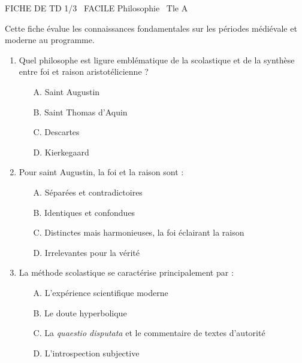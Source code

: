 \documentclass[11pt]{article}
\begin{document}
\begin{tcolorbox}[enhanced,colback=popink,colframe=popink,arc=10pt,boxrule=0pt,left=12pt,right=12pt,top=9pt,bottom=9pt]
{\color{white}\popxbold\small FICHE DE TD 1/3 \textbullet\ FACILE \hfill Philosophie \textbullet\ Tle A\par}
\end{tcolorbox}
\vspace{4pt}
Cette fiche évalue les connaissances fondamentales sur les périodes médiévale et moderne au programme.

\begin{exercice}
\begin{enumerate}
    \item Quel philosophe est ligure emblématique de la scolastique et de la synthèse entre foi et raison aristotélicienne ?
    \begin{itemize}
        \item[A.] Saint Augustin
        \item[B.] Saint Thomas d'Aquin
        \item[C.] Descartes
        \item[D.] Kierkegaard
    \end{itemize}
    \item Pour saint Augustin, la foi et la raison sont :
    \begin{itemize}
        \item[A.] Séparées et contradictoires
        \item[B.] Identiques et confondues
        \item[C.] Distinctes mais harmonieuses, la foi éclairant la raison
        \item[D.] Irrelevantes pour la vérité
    \end{itemize}
    \item La méthode scolastique se caractérise principalement par :
    \begin{itemize}
        \item[A.] L'expérience scientifique moderne
        \item[B.] Le doute hyperbolique
        \item[C.] La \textit{quaestio disputata} et le commentaire de textes d'autorité
        \item[D.] L'introspection subjective
    \end{itemize}
\end{enumerate}
\end{exercice}
\end{document}
